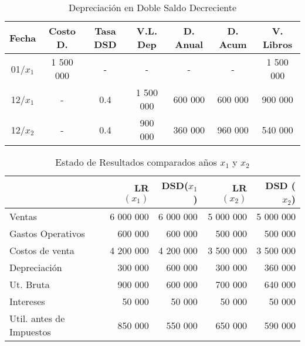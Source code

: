 \documentclass[10pt,a4paper]{report}
\begin{document}
		\begin{table}[h]
	\centering
	\caption{Depreciación en Doble Saldo Decreciente}	
	
	\begin{tabular}{|c|c|c|c|c|c|c|} \hline
	
	Fecha    & Costo D.  & Tasa DSD & V.L. Dep  & D. Anual & D. Acum & V. Libros \\ \hline

	01/$x_1$ & 1 500 000 & -        & -         & -        & -       & 1 500 000 \\ \hline

	12/$x_1$ & -         & 0.4      & 1 500 000 & 600 000  & 600 000 & 900 000   \\ \hline

	12/$x_2$ & -         & 0.4      & 900 000   & 360 000  & 960 000 & 540 000   \\ \hline
	
	
	\end{tabular}
	\end{table}
	\begin{table}[h!]
	\centering
	\caption{Estado de Resultados comparados años $x_1$ y $x_2$}
	\begin{tabular}{l|r|r||r|r} 
	                          & LR $(x_1)$ & DSD($x_1$) & LR $(x_2)$ & DSD ($x_2$) \\ \hline
	 Ventas                   & 6 000 000  & 6 000 000  & 5 000 000  & 5 000 000   \\
	 Gastos Operativos        & 600 000    & 600 000    & 500 000    & 500 000     \\
	 Costos de venta          & 4 200 000  & 4 200 000  & 3 500 000  & 3 500 000   \\
	 Depreciación             & 300 000    & 600 000    & 300 000    & 360 000     \\ \hline
	 Ut. Bruta                & 900 000    & 600 000    & 700 000    & 640 000     \\
	 Intereses                & 50 000     & 50 000     & 50 000     & 50 000      \\ \hline
	 Util. antes de Impuestos & 850 000    & 550 000    & 650 000    & 590 000
 	\end{tabular}
	\end{table}
		 
\newpage%
\end{document}
